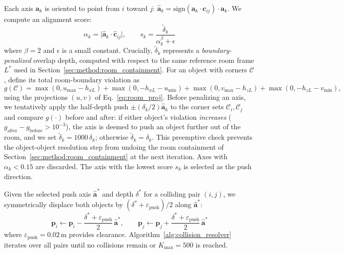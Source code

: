 Each axis $\mathbf{a}_k$ is oriented to point from $i$ toward $j$: $\hat{\mathbf{a}}_k = \mathrm{sign}(\mathbf{a}_k \cdot \mathbf{c}_{ij}) \cdot \mathbf{a}_k$. We compute an alignment score:
\begin{equation}
\alpha_k = \big|\hat{\mathbf{a}}_k \cdot \hat{\mathbf{c}}_{ij}\big|, \qquad
s_k = \frac{\tilde{\delta}_k}{\alpha_k^{\beta} + \epsilon}
\label{eq:axis_score}
\end{equation}
where $\beta=2$ and $\epsilon$ is a small constant. Crucially, $\tilde{\delta}_k$ represents a \emph{boundary-penalized} overlap depth, computed with respect to the same reference room frame $L^\ast$ used in Section~\ref{sec:method:room_containment}. For an object with corners $\mathcal{C}$, define its total room-boundary violation as
\begin{equation}
g(\mathcal{C}) = \max(0, u_{\max}-h_{xL}) + \max(0, -h_{xL}-u_{\min}) + \max(0, v_{\max}-h_{zL}) + \max(0, -h_{zL}-v_{\min}),
\label{eq:oob}
\end{equation}
using the projections $(u,v)$ of Eq.~\eqref{eq:room_proj}. Before penalizing an axis, we tentatively apply the half-depth push $\pm(\delta_k/2)\hat{\mathbf{a}}_k$ to the corner sets $\mathcal{C}_i, \mathcal{C}_j$ and compare $g(\cdot)$ before and after: if either object's violation \emph{increases} ($g_{\text{after}} - g_{\text{before}} > 10^{-3}$), the axis is deemed to push an object further out of the room, and we set $\tilde{\delta}_k = 1000\,\delta_k$; otherwise $\tilde{\delta}_k = \delta_k$. This preemptive check prevents the object-object resolution step from undoing the room containment of Section~\ref{sec:method:room_containment} at the next iteration. Axes with $\alpha_k < 0.15$ are discarded. The axis with the lowest score $s_k$ is selected as the push direction.



Given the selected push axis $\hat{\mathbf{a}}^*$ and depth $\delta^*$ for a colliding pair $(i, j)$, we symmetrically displace both objects by $(\delta^* + \varepsilon_{\mathrm{push}}) / 2$ along $\hat{\mathbf{a}}^*$:
\begin{equation}
\mathbf{p}_i \gets \mathbf{p}_i - \frac{\delta^* + \varepsilon_{\mathrm{push}}}{2}\, \hat{\mathbf{a}}^*, \qquad
\mathbf{p}_j \gets \mathbf{p}_j + \frac{\delta^* + \varepsilon_{\mathrm{push}}}{2}\, \hat{\mathbf{a}}^*
\label{eq:push}
\end{equation}
where $\varepsilon_{\mathrm{push}} = 0.02\,\text{m}$ provides clearance. Algorithm~\ref{alg:collision_resolver} iterates over all pairs until no collisions remain or $K_{\max} = 500$ is reached.